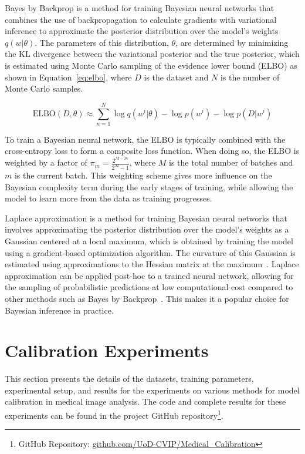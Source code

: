 Bayes by Backprop is a method for training Bayesian neural networks that combines the use of backpropagation to calculate gradients with variational inference to approximate the posterior distribution over the model's weights $q(w|\theta)$. The parameters of this distribution, $\theta$, are determined by minimizing the KL divergence between the variational posterior and the true posterior, which is estimated using Monte Carlo sampling of the evidence lower bound (ELBO) as shown in Equation~\ref{eq:elbo}, where $D$ is the dataset and $N$ is the number of Monte Carlo samples.

\begin{equation}
	\text{ELBO}(D, \theta) \approx \sum^N_{n=1}\log q(w^i|\theta)-\log p(w^i) - \log p(D|w^i)
	\label{eq:elbo}
\end{equation}

To train a Bayesian neural network, the ELBO is typically combined with the cross-entropy loss to form a composite loss function. When doing so, the ELBO is weighted by a factor of $\pi_m = \frac{2^{M-m}}{2^M-1}$, where $M$ is the total number of batches and $m$ is the current batch. This weighting scheme gives more influence on the Bayesian complexity term during the early stages of training, while allowing the model to learn more from the data as training progresses.

Laplace approximation is a method for training Bayesian neural networks that involves approximating the posterior distribution over the model's weights as a Gaussian centered at a local maximum, which is obtained by training the model using a gradient-based optimization algorithm. The curvature of this Gaussian is estimated using approximations to the Hessian matrix at the maximum~\cite{mackay1992bayesian,botev2017practical}. Laplace approximation can be applied post-hoc to a trained neural network, allowing for the sampling of probabilistic predictions at low computational cost compared to other methods such as Bayes by Backprop~\cite{daxberger2021laplace}. This makes it a popular choice for Bayesian inference in practice.



\section{Calibration Experiments}
\label{sec:calibration_experiments}
This section presents the details of the datasets, training parameters, experimental setup, and results for the experiments on various methods for model calibration in medical image analysis. The code and complete results for these experiments can be found in the project GitHub repository\footnote{GitHub Repository: \url{github.com/UoD-CVIP/Medical_Calibration}}.

